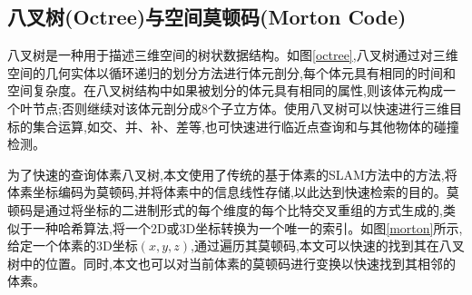 \subsection{八叉树(Octree)与空间莫顿码(Morton Code)}
\begin{figure}[htbp]
    \centering
    \centering
\end{figure}
八叉树是一种用于描述三维空间的树状数据结构。如图\ref{octree},八叉树通过对三维空间的几何实体以循环递归的划分方法进行体元剖分,每个体元具有相同的时间和空间复杂度。在八叉树结构中如果被划分的体元具有相同的属性,则该体元构成一个叶节点;否则继续对该体元剖分成8个子立方体。使用八叉树可以快速进行三维目标的集合运算,如交、并、补、差等,也可快速进行临近点查询和与其他物体的碰撞检测。

为了快速的查询体素八叉树,本文使用了传统的基于体素的SLAM方法\cite{traditionalslam}中的方法,将体素坐标编码为莫顿码,并将体素中的信息线性存储,以此达到快速检索的目的。莫顿码是通过将坐标的二进制形式的每个维度的每个比特交叉重组的方式生成的,类似于一种哈希算法,将一个2D或3D坐标转换为一个唯一的索引。如图\ref{morton}所示,给定一个体素的3D坐标$(x,y,z)$,通过遍历其莫顿码,本文可以快速的找到其在八叉树中的位置。同时,本文也可以对当前体素的莫顿码进行变换以快速找到其相邻的体素。
